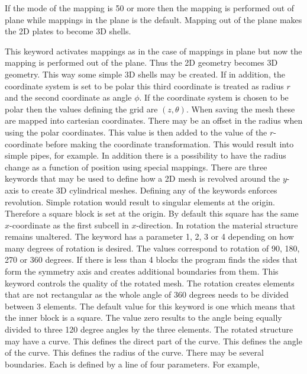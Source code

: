 If the mode of the mapping is 50 or more then 
the mapping is performed out of plane while mappings 
in the plane is the default.
Mapping out of the plane makes the 2D plates to become 3D shells.

This keyword activates mappings as in the case of mappings in plane 
but now the mapping is performed 
out of the plane. 
Thus the 2D geometry becomes 3D geometry.
This way some simple 3D shells may be created. 
If in addition, the coordinate system is set to be polar this 
third coordinate is treated as radius $r$ and the second
coordinate as angle $\phi$. 
%
If the coordinate system is chosen to be polar then 
the values defining the grid are $(z,\theta)$.
When saving the mesh these are mapped into cartesian coordinates.
There may be an offset in the radius when using the polar coordinates.
This value is then added to the value of the $r$-coordinate before making the
coordinate transformation. This would result into simple pipes, for example.
In addition there is a possibility to have the radius change as a function
of position using special mappings.
%
There are three keywords that may be used to define how a 2D mesh is revolved
around the $y$-axis
to create 3D cylindrical meshes.
Defining any of the keywords enforces revolution.
Simple rotation would result to singular elements at the 
origin. Therefore a square block is set at the origin.
By default this square has the same $x$-coordinate as the
first subcell in $x$-direction.
In rotation the material structure remains unaltered. 
%
The keyword has a parameter 1, 2, 3 or 4 depending on 
how many degrees of rotation is desired. The values 
correspond to rotation of 90, 180, 270 or 360 degrees.
If there is less than 4
blocks the program finds the sides that form the 
symmetry axis and creates additional boundaries from them.   
%
This keyword controls the quality of the rotated mesh.
The rotation creates elements that are not rectangular as
the whole angle of 360 degrees needs to be divided between 3
elements. The default value for this keyword is one 
which means that the inner block is a square.
The value zero results to the angle being equally divided to three 
120 degree angles by the three elements.
%
The rotated structure may have a curve. This defines the 
direct part of the curve.
This defines the angle of the curve.
This defines the radius of the curve.
%
There may be several boundaries. Each is defined by a line
of four parameters.  For example,

